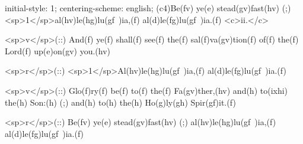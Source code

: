 initial-style: 1;
centering-scheme: english;
(c4)Be(fv) ye(e) stead(gv)fast(hv) (;) <sp>1</sp>al(hv)le(hg)lu(gf~)ia,(f) al(d)le(fg)lu(gf~)ia.(f) <c>ii.</c>

<sp>v</sp>(::) And(f) ye(f) shall(f) see(f) the(f) sal(f)va(gv)tion(f) of(f) the(f) Lord(f) up(e)on(gv) you.(hv)

<sp>r</sp>(::) <sp>1</sp>Al(hv)le(hg)lu(gf~)ia,(f) al(d)le(fg)lu(gf~)ia.(f)

<sp>v</sp>(::) Glo(f)ry(f) be(f) to(f) the(f) Fa(gv)ther,(hv) and(h) to(ixhi) the(h) Son:(h) (;) and(h) to(h) the(h) Ho(g)ly(gh) Spir(gf)it.(f)

<sp>r</sp>(::) Be(fv) ye(e) stead(gv)fast(hv) (;) al(hv)le(hg)lu(gf~)ia,(f) al(d)le(fg)lu(gf~)ia.(f)